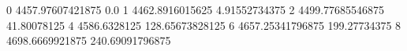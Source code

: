 0 4457.97607421875 0.0
1 4462.8916015625 4.91552734375
2 4499.77685546875 41.80078125
4 4586.6328125 128.65673828125
6 4657.25341796875 199.27734375
8 4698.6669921875 240.69091796875
